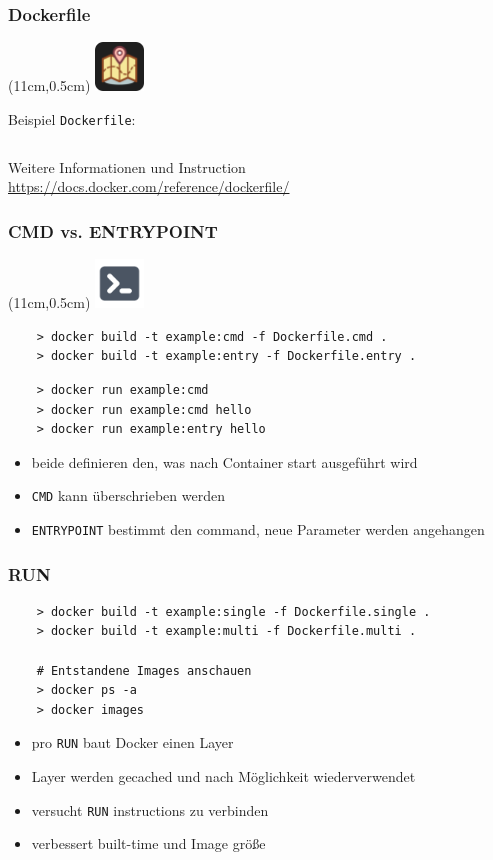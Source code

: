 \documentclass[22pt]{beamer}
\newcommand{\code}[1]{\colorbox{gray!10}{\texttt{#1}}}
\newcommand{\codeTour}{
    \begin{textblock*}{1.3cm}(11cm,0.5cm) %
    \includegraphics[width=1.3cm]{Bilder/CodeTour.png}
    \end{textblock*}
}
\newcommand{\terminal}{
    \begin{textblock*}{1.3cm}(11cm,0.5cm) %
    \includegraphics[width=1.3cm]{Bilder/terminal.png}
    \end{textblock*}
}
\begin{document}
\begin{frame}[fragile]
    \frametitle{Dockerfile}
    \codeTour

    Beispiel \code{Dockerfile}: 
    \inputminted[fontsize=\footnotesize, frame=lines]{Dockerfile}{../examples/Dockerfile}\medskip 
    Weitere Informationen und Instruction
    \href{https://docs.docker.com/reference/dockerfile/#overview}{https://docs.docker.com/reference/dockerfile/}
\end{frame}

\begin{frame}[fragile]
    \frametitle{CMD vs. ENTRYPOINT}
    \terminal
    \begin{verbatim}
    > docker build -t example:cmd -f Dockerfile.cmd .
    > docker build -t example:entry -f Dockerfile.entry .
    \end{verbatim} 
    \pause
    \begin{verbatim}
    > docker run example:cmd
    > docker run example:cmd hello
    > docker run example:entry hello        
    \end{verbatim}
    \pause \medskip
    \begin{itemize}
        \item beide definieren den, was nach Container start ausgeführt wird
        \item \code{CMD} kann überschrieben werden
        \item \code{ENTRYPOINT} bestimmt den command, neue Parameter werden angehangen
    \end{itemize}
\end{frame}

\begin{frame}[fragile]
    \frametitle{RUN} %
    \begin{verbatim}
    > docker build -t example:single -f Dockerfile.single .
    > docker build -t example:multi -f Dockerfile.multi .

    # Entstandene Images anschauen
    > docker ps -a
    > docker images
    \end{verbatim}
    \pause\medskip
    \begin{itemize}
        \item pro \code{RUN} baut Docker einen Layer
        \item Layer werden gecached und nach Möglichkeit wiederverwendet
        \item versucht \code{RUN} instructions zu verbinden
        \item verbessert built-time und Image größe
    \end{itemize}
\end{frame}
\end{document}
